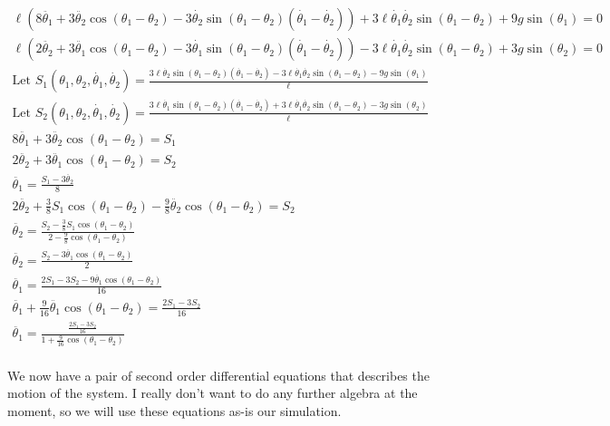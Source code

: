 \documentclass[]{article}
\begin{document}
\begin{gather*}
	\ell(8\ddot{\theta_1} + 3\ddot{\theta_2}\cos(\theta_1 - \theta_2) - 3\dot{\theta_2}\sin(\theta_1 - \theta_2)(\dot{\theta_1} - \dot{\theta_2})) + 3\ell\dot{\theta_1}\dot{\theta_2}\sin(\theta_1 - \theta_2) + 9g\sin(\theta_1) =  0 \\
	\ell(2\ddot{\theta_2} + 3\ddot{\theta_1}\cos(\theta_1 - \theta_2) - 3\dot{\theta_1}\sin(\theta_1 - \theta_2)(\dot{\theta_1} - \dot{\theta_2})) - 3\ell\dot{\theta_1}\dot{\theta_2}\sin(\theta_1 - \theta_2) + 3g\sin(\theta_2) = 0 \\
	\text{Let } S_1(\theta_1, \theta_2, \dot{\theta_1}, \dot{\theta_2}) = \frac{3\ell\dot{\theta_2}\sin(\theta_1 - \theta_2)(\dot{\theta_1} - \dot{\theta_2}) - 3\ell\dot{\theta_1}\dot{\theta_2}\sin(\theta_1 - \theta_2) - 9g\sin(\theta_1)}{\ell} \\
	\text{Let } S_2(\theta_1, \theta_2, \dot{\theta_1}, \dot{\theta_2})  = \frac{3\ell\dot{\theta_1}\sin(\theta_1 - \theta_2)(\dot{\theta_1} - \dot{\theta_2}) + 3\ell\dot{\theta_1}\dot{\theta_2}\sin(\theta_1 - \theta_2) - 3g\sin(\theta_2)}{\ell} \\
	8\ddot{\theta_1} + 3\ddot{\theta_2}\cos(\theta_1 - \theta_2) = S_1 \\
	2\ddot{\theta_2} + 3\ddot{\theta_1}\cos(\theta_1 - \theta_2) = S_2 \\
	\ddot{\theta_1} = \frac{S_1 - 3\ddot{\theta_2}}{8} \\
	2\ddot{\theta_2} + \frac38S_1\cos(\theta_1 - \theta_2) - \frac98\ddot{\theta_2}\cos(\theta_1 - \theta_2) = S_2 \\
	\ddot{\theta_2} = \frac{S_2 - \frac38S_1\cos(\theta_1 - \theta_2)}{2 - \frac98\cos(\theta_1 - \theta_2)} \\
	\ddot{\theta_2} = \frac{S_2 - 3\ddot{\theta_1}\cos(\theta_1 - \theta_2)}{2} \\
	\ddot{\theta_1} = \frac{2S_1 - 3S_2 - 9\ddot{\theta_1}\cos(\theta_1 - \theta_2)}{16} \\
	\ddot{\theta_1} + \frac{9}{16}\ddot{\theta_1}\cos(\theta_1 - \theta_2) = \frac{2S_1 - 3S_2}{16} \\
	\ddot{\theta_1} = \frac{\frac{2S_1 - 3S_2}{16}}{1 + \frac{9}{16}\cos(\theta_1 - \theta_2)} \\
\end{gather*}

We now have a pair of second order differential equations that describes the motion of the system. I really don't want to do any further algebra at the moment, so we will use these equations as-is our simulation.
\end{document}
